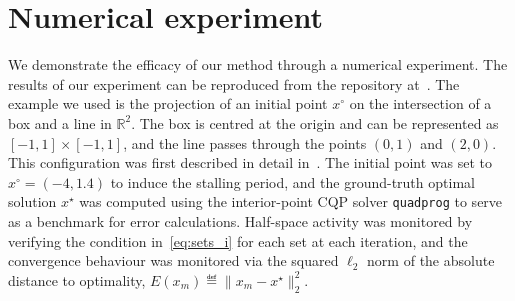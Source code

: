 \section{Numerical experiment} \label{sec:example}

We demonstrate the efficacy of our method through a numerical experiment. The results of our experiment can be reproduced from the repository at~\cite{DykstraProjectRepo}. The example we used is the projection of an initial point $x^\circ$ on the intersection of a box and a line in $\mathbb{R}^2$. The box is centred at the origin and can be represented as $[-1, 1] \times [-1, 1]$, and the line passes through the points $(0,1)$ and $(2, 0)$. This configuration was first described in detail in~\cite{DYKSTRASTALLING}. The initial point was set to $x^\circ = (-4, 1.4)$ to induce the stalling period, and the ground-truth optimal solution $x^\star$ was computed using the interior-point CQP solver \texttt{quadprog} to serve as a benchmark for error calculations. Half-space activity was monitored by verifying the condition in~\eqref{eq:sets_i} for each set at each iteration, and the convergence behaviour was monitored via the squared $\ell_2$ norm of the absolute distance to optimality, $E(x_m) \eqdef \| x_m - x^\star \|_2^2$.


